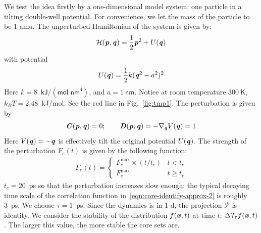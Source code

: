 \documentclass[aip,jcp,a4paper,reprint,onecolumn]{revtex4-1}
\newcommand{\vect}[1]{\textbf{\textit{#1}}}
\newcommand{\mh}{\mathcal H}
\newcommand{\mt}{\mathcal T}
\begin{document}
We test the idea firstly by a one-dimensional model system: one particle in a
tilting double-well potential. For convenience, we let the mass of the
particle to be 1 \textsf{amu}. The unperturbed
Hamiltonian of the system is given by:
\begin{align}
  \mh (\vect p, \vect q) = \frac 12 \vect p^2 + U(\vect q) 
\end{align}
with potential
\begin{align}
  U(\vect q) = \frac12 k (\vect q^2 - a^2)^2
\end{align}
Here $k = 8$~$\textsf{kJ} / (\textsf{mol nm}^4)$, and $ a = 1\ \textsf{nm}$.
Notice at room temperature $300\ \textsf{K}$, $k_BT = 2.48$~\textsf{kJ/mol}.
See the red line in Fig.~\ref{fig:tmp1}.
The perturbation is given by
\begin{align}
  \vect C(\vect p, \vect q) = 0; \qquad
  \vect D(\vect p, \vect q) = -\nabla_{\vect q} V(\vect q) = 1
\end{align}
Here $V(\vect q) = -\vect q$ is  effectively tilt the original
potential $U(\vect q)$. The strength of the perturbation $F_e(t)$ is given
by the following function:
\begin{align}
  F_e(t) = 
  \begin{cases}
    F_e^{\textrm{max}}\times (t / t_c) & t < t_c \\
    F_e^{\textrm{max}} & t \geq t_c
  \end{cases}
\end{align}
$t_c = 20$~\textsf{ps} so that the perturbation increases slow
enough: the typical decaying time scale of the correlation function
in~\eqref{eqn:core-identify-approx-2} is roughly 3~\textsf{ps}.
We choose $\tau = 1$~\textsf{ps}.
Since the dynamics is in
1-d, the projection $\mathcal P$ is identity.  We consider the stability of the
distribution $f(\vect x, t)$ at time $t$: $\Delta\mt_\tau f(\vect x, t)$.
The larger
this value, the more stable the core sets are.
\end{document}

